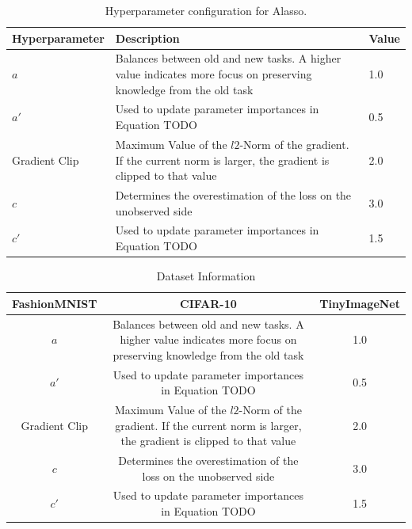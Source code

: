 \begin{table}
    \centering
    \begin{tabularx}{\textwidth}{X | X X } 
        \hline
        Hyperparameter & Description & Value \\ 
        \hline 
        $a$ & Balances between old and new tasks. A higher value indicates more focus
        on preserving knowledge from the old task & 1.0  \\ 
        $a'$ & Used to update parameter importances in Equation TODO & 0.5  \\
        Gradient Clip & Maximum Value of the $l2$-Norm of the gradient. If the current norm is larger, the
        gradient is clipped to that value & 2.0 \\ 
        $c$ & Determines the overestimation of the loss on the unobserved side & 3.0 \\
        $c'$ & Used to update parameter importances in Equation TODO & 1.5 \\
        \hline
    \end{tabularx}
    \caption{Hyperparameter configuration for Alasso.}
    \label{fig:AlassoParams}
\end{table}

\begin{table}
    \centering
    \begin{tabularx}{\textwidth}{c | c c } 
        \hline
         FashionMNIST & CIFAR-10 & TinyImageNet \\ 
        \hline 
        $a$ & Balances between old and new tasks. A higher value indicates more focus
        on preserving knowledge from the old task & 1.0  \\ 
        $a'$ & Used to update parameter importances in Equation TODO & 0.5  \\
        Gradient Clip & Maximum Value of the $l2$-Norm of the gradient. If the current norm is larger, the
        gradient is clipped to that value & 2.0 \\ 
        $c$ & Determines the overestimation of the loss on the unobserved side & 3.0 \\
        $c'$ & Used to update parameter importances in Equation TODO & 1.5 \\
        \hline
    \end{tabularx}
    \caption{Dataset Information}
    \label{fig:DatasetInformtion}
\end{table}

